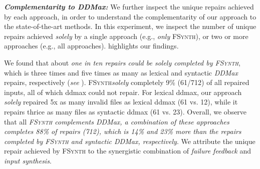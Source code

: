\documentclass[sigconf,review,anonymous]{acmart}
\newcommand{\approach}{\textsc{FSynth}\xspace}
\newcommand{\ddmax}{\textit{DDMax}\xspace}
\begin{document}
\noindent \textbf{\textit{Complementarity to \ddmax:}} We further inspect the unique repairs achieved by each approach, in order to understand the complementarity of our approach to the state-of-the-art methods. In this experiment, we inspect the number of unique repairs achieved \textit{solely} by a single approach (e.g., \textit{only} \approach), or two or more approaches (e.g., all approaches). 
 highlights our findings. 

We found that about \textit{one in ten repairs could be solely completed by \approach}, which is three times and five times as many as lexical and syntactic \ddmax %
repairs, respectively (\textit{see} ). \approach \textit{solely} completely 9\% (61/712) of all repaired inputs, all of which ddmax could not repair. For lexical ddmax, our approach \textit{solely} repaired 5x as many invalid files as lexical ddmax (61 vs. 12), while it repairs thrice as many files as syntactic ddmax (61 vs. 23). Overall, we observe that all \textit{\approach complements \ddmax, a combination of these approaches completes 88\% of repairs (712), which is 14\% and 23\% more than the repairs completed by \approach and syntactic \ddmax, respectively}. 
We attribute the unique repair achieved by \approach to the synergistic combination of \textit{failure feedback} and \textit{input synthesis}. %
\end{document}
